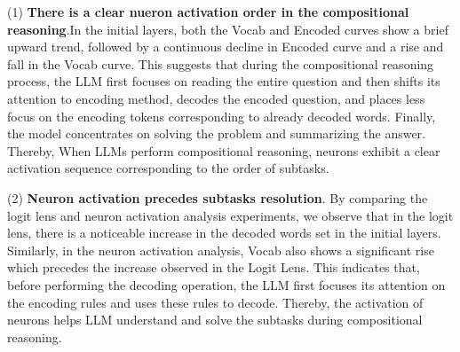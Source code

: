 \begin{table*}[h!]
\centering
\caption{Key tokens, corresponding layers, and their corresponding functions
}
\label{tab:layer_function_table}
\vskip 0.15in
\vskip -0.1in
\end{table*}

(1) \textbf{There is a clear nueron activation order in the compositional reasoning}.In the initial layers, both the Vocab and Encoded curves show a brief upward trend, followed by a continuous decline in Encoded curve and a rise and fall in the Vocab curve. This suggests that during the compositional reasoning process, the LLM first focuses on reading the entire question and then shifts its attention to encoding method, decodes the encoded question, and places less focus on the encoding tokens corresponding to already decoded words. Finally, the model concentrates on solving the problem and summarizing the answer. Thereby, When LLMs perform compositional reasoning, neurons exhibit a clear activation sequence corresponding to the order of subtasks.

(2) \textbf{Neuron activation precedes subtasks resolution}. By comparing the logit lens and neuron activation analysis experiments, we observe that in the logit lens, there is a noticeable increase in the decoded words set in the initial layers. Similarly, in the neuron activation analysis, Vocab also shows a significant rise which precedes the increase observed in the Logit Lens. This indicates that, before performing the decoding operation, the LLM first focuses its attention on the encoding rules and uses these rules to decode. Thereby, the activation of neurons helps LLM understand and solve the subtasks during compositional reasoning.

